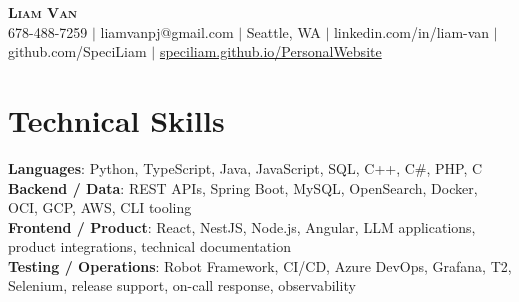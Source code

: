 \documentclass[letterpaper,11pt]{article}
\begin{document}

%
\begin{center}
    \textbf{\Huge \scshape Liam Van} \\ \vspace{1pt}
    \small 678-488-7259 $|$ \small {liamvanpj@gmail.com} $|$ Seattle, WA
 {{$|$ linkedin.com/in/liam-van} {$|$ github.com/SpeciLiam} {$|$ \href{https://speciliam.github.io/PersonalWebsite}{speciliam.github.io/PersonalWebsite}}}

\end{center}

\section{Technical Skills}
 \begin{itemize}[leftmargin=0.15in, label={}]
    \small{\item{
     \textbf{Languages}{: Python, TypeScript, Java, JavaScript, SQL, C++, C\#, PHP, C} \\
     \textbf{Backend / Data}{: REST APIs, Spring Boot, MySQL, OpenSearch, Docker, OCI, GCP, AWS, CLI tooling} \\
     \textbf{Frontend / Product}{: React, NestJS, Node.js, Angular, LLM applications, product integrations, technical documentation} \\
     \textbf{Testing / Operations}{: Robot Framework, CI/CD, Azure DevOps, Grafana, T2, Selenium, release support, on-call response, observability} \\
    }}
 \end{itemize}
%
\end{document}
